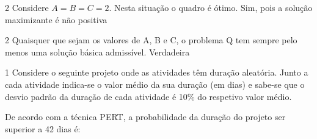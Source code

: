 \documentclass[\mainfilename]{subfiles}
\begin{document}
\begin{questionBox}2{ %
    Considere \(A=B=C=2\). Nesta situação o quadro é ótimo.
} %
    Sim, pois a solução maximizante é não positiva
\end{questionBox}

\begin{questionBox}2{ %
    Quaisquer que sejam os valores de A, B e C, o problema Q tem sempre pelo menos uma solução básica admissível.
} %
    Verdadeira
\end{questionBox}

\group{}

\setcounter{question}{1}

\begin{questionBox}1{ %
    Considere o seguinte projeto onde as atividades têm duração aleatória. Junto a cada atividade indica-se o valor médio da sua duração (em dias) e sabe-se que o desvio padrão da duração de cada atividade é 10\% do respetivo valor médio.
} %

    \tikzset{external/remake next=true} %
    \begin{center}
    \end{center}

    De acordo com a técnica PERT, a probabilidade da duração do projeto ser superior a 42 dias é:


\end{questionBox}
\end{document}
